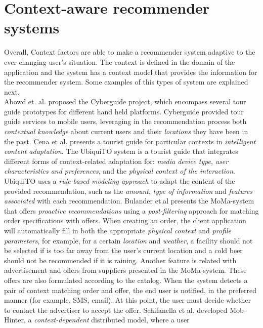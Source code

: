 \section{Context-aware recommender systems} 
Overall, Context factors are able to make a recommender system 
adaptive to the ever changing user's situation. The
context is defined in the domain of the application and the system has
a context model that provides the information for the recommender
system. Some  examples of this types of system are explained
next. \\
Abowd et. al. \cite{abowd1997cyberguide} proposed the
Cyberguide project, which encompass several tour 
guide prototypes for different hand held platforms. 
Cyberguide provided tour guide services to mobile users,
leveraging in the recommendation process both 
\textit{contextual knowledge} about current users and their 
\textit{locations} they have been in the past. 
Cena et al. \cite{cena2006integrating} presents a tourist guide for particular 
contexts in \textit{intelligent content adaptation}. The UbiquiTO system is a
tourist guide that integrates different forms of context-related
adaptation for: \textit{media device type}, \textit{user characteristics and
preferences}, and the \textit{physical context of the interaction}. UbiquiTO uses
a \textit{rule-based modeling approach} to adapt the content of the provided
recommendation, such as the \textit{amount}, \textit{type of information} and 
\textit{features associated} with each recommendation. 
Bulander et.al \cite{bulander2005comparison} presents the MoMa-system 
that offers \textit{proactive recommendations} using a \textit{post-filtering} 
approach for matching order specifications with offers. 
When creating an order, the client application will automatically fill in both the 
appropriate \textit{physical context} and \textit{profile parameters}, for example, 
for a certain \textit{location} and \textit{weather}, a facility should not be selected
if is too far away from the user's current location and a cold beer should not be
recommended if it is raining. Another feature is related with 
advertisement and offers from suppliers presented in the MoMa-system. These offers are also
formulated according to the catalog. When the system detects a pair
of context matching order and offer, the end user is notified, in the
preferred manner (for example, SMS, email). At this point, the user
must decide whether to contact the advertiser to accept the offer.
Schifanella et al. \cite{schifanella2008mobhinter} developed
Mob-Hinter, a \textit{context-dependent} distributed model, where a user 
